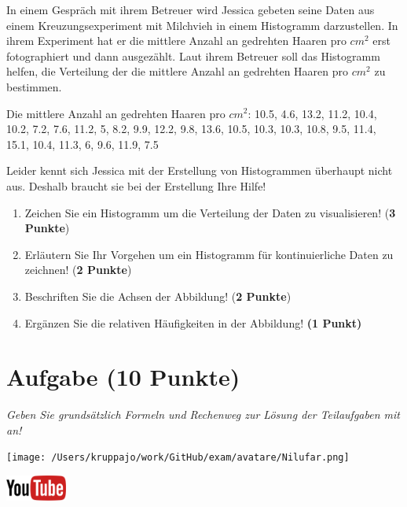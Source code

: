 \documentclass[a4paper, 9pt]{scrartcl}\usepackage[]{graphicx}\usepackage[]{xcolor}
\begin{document}
In einem Gespräch mit ihrem Betreuer wird Jessica gebeten seine Daten aus einem Kreuzungsexperiment mit Milchvieh in einem Histogramm darzustellen. In ihrem Experiment hat er die mittlere Anzahl an gedrehten Haaren pro $cm^2$ erst fotographiert und dann ausgezählt. Laut ihrem Betreuer soll das Histogramm helfen, die Verteilung der die mittlere Anzahl an gedrehten Haaren pro $cm^2$ zu bestimmen.

\begin{center}
Die mittlere Anzahl an gedrehten Haaren pro $cm^2$: 10.5, 4.6, 13.2, 11.2, 10.4, 10.2, 7.2, 7.6, 11.2, 5, 8.2, 9.9, 12.2, 9.8, 13.6, 10.5, 10.3, 10.3, 10.8, 9.5, 11.4, 15.1, 10.4, 11.3, 6, 9.6, 11.9, 7.5
\end{center}

Leider kennt sich Jessica mit der Erstellung von Histogrammen überhaupt nicht aus. Deshalb braucht sie bei der Erstellung Ihre Hilfe!

\begin{enumerate}
\item Zeichen Sie ein Histogramm um die Verteilung der Daten zu
  visualisieren! (\textbf{3 Punkte})
 \item Erläutern Sie Ihr Vorgehen um ein Histogramm für kontinuierliche
  Daten zu zeichnen!  (\textbf{2 Punkte})
\item Beschriften Sie die Achsen der Abbildung! (\textbf{2 Punkte})
\item Ergänzen Sie die relativen Häufigkeiten in der Abbildung! \textbf{(1
    Punkt)}  
\end{enumerate}

 
\clearpage

\section{Aufgabe \hfill (10 Punkte)}

\textit{Geben Sie grundsätzlich Formeln und Rechenweg zur Lösung der Teilaufgaben mit an!} \\[1Ex]
 

 
\begin{minipage}[t]{0.5\textwidth}
\texttt{[image: /Users/kruppajo/work/GitHub/exam/avatare/Nilufar.png]}
\end{minipage}
\begin{minipage}[t]{0.5\textwidth}
\hfill
\href{https://youtu.be/VAqiUdV4WQ0}{\includegraphics[width = 2cm]{img/youtube}}\\[1Ex]
\end{minipage}
\vspace{1ex}
\end{document}
